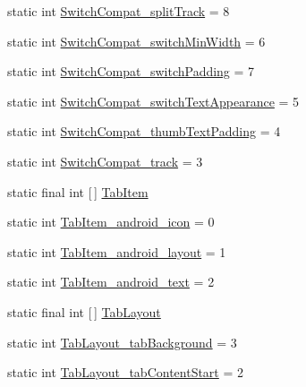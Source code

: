 \begin{DoxyCompactItemize}
\item 
static int \hyperlink{classandroid_1_1support_1_1v7_1_1appcompat_1_1R_1_1styleable_aa41174bd1ec0a51b5ba86f4ac3002531}{Switch\+Compat\+\_\+split\+Track} = 8
\item 
static int \hyperlink{classandroid_1_1support_1_1v7_1_1appcompat_1_1R_1_1styleable_ae597e60df7253abca490d743cc73bd17}{Switch\+Compat\+\_\+switch\+Min\+Width} = 6
\item 
static int \hyperlink{classandroid_1_1support_1_1v7_1_1appcompat_1_1R_1_1styleable_a1e99c3ed5f4af85046d43bd8e1f6f61e}{Switch\+Compat\+\_\+switch\+Padding} = 7
\item 
static int \hyperlink{classandroid_1_1support_1_1v7_1_1appcompat_1_1R_1_1styleable_accc91eca4539833e0ff7735849450846}{Switch\+Compat\+\_\+switch\+Text\+Appearance} = 5
\item 
static int \hyperlink{classandroid_1_1support_1_1v7_1_1appcompat_1_1R_1_1styleable_a3401586689d04cc21ba913560a965943}{Switch\+Compat\+\_\+thumb\+Text\+Padding} = 4
\item 
static int \hyperlink{classandroid_1_1support_1_1v7_1_1appcompat_1_1R_1_1styleable_a5b22cfa465ad7bdc9074b49b94bfc8fb}{Switch\+Compat\+\_\+track} = 3
\item 
static final int \mbox{[}$\,$\mbox{]} \hyperlink{classandroid_1_1support_1_1v7_1_1appcompat_1_1R_1_1styleable_a78bd85485eab436a2e9ff45b047ab398}{Tab\+Item}
\item 
static int \hyperlink{classandroid_1_1support_1_1v7_1_1appcompat_1_1R_1_1styleable_a5beb46e28b591f7a939c569653d442f1}{Tab\+Item\+\_\+android\+\_\+icon} = 0
\item 
static int \hyperlink{classandroid_1_1support_1_1v7_1_1appcompat_1_1R_1_1styleable_af67b494fa3cd9c41f653f980b03f2842}{Tab\+Item\+\_\+android\+\_\+layout} = 1
\item 
static int \hyperlink{classandroid_1_1support_1_1v7_1_1appcompat_1_1R_1_1styleable_a59c1aa999efd1466edb691855094aaec}{Tab\+Item\+\_\+android\+\_\+text} = 2
\item 
static final int \mbox{[}$\,$\mbox{]} \hyperlink{classandroid_1_1support_1_1v7_1_1appcompat_1_1R_1_1styleable_a3c85d0c4cebbccf5b1a16ecfe13938ca}{Tab\+Layout}
\item 
static int \hyperlink{classandroid_1_1support_1_1v7_1_1appcompat_1_1R_1_1styleable_ae47f32276712afa05b06431da195e5bb}{Tab\+Layout\+\_\+tab\+Background} = 3
\item 
static int \hyperlink{classandroid_1_1support_1_1v7_1_1appcompat_1_1R_1_1styleable_ac351b0e0ca156fa1d4e6ed647ade8ac6}{Tab\+Layout\+\_\+tab\+Content\+Start} = 2

\end{DoxyCompactItemize}
